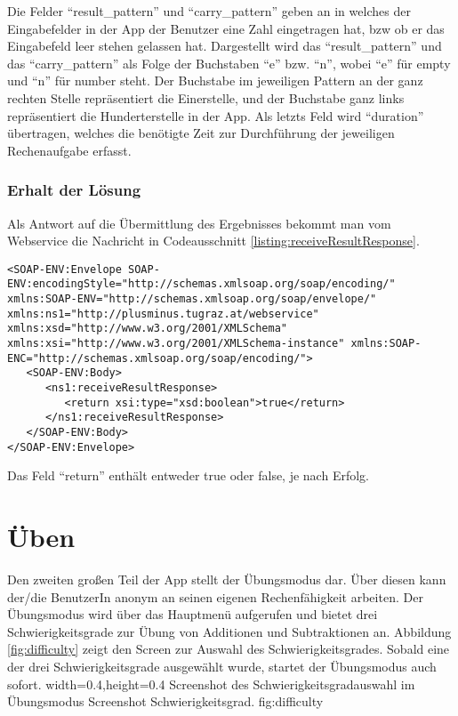 Die Felder \enquote{result\_pattern} und \enquote{carry\_pattern} geben an in welches der Eingabefelder
in der App der Benutzer eine Zahl eingetragen hat, bzw ob er das Eingabefeld leer stehen gelassen hat.
Dargestellt wird das \enquote{result\_pattern} und das \enquote{carry\_pattern} als Folge der Buchstaben
\enquote{e} bzw. \enquote{n}, wobei \enquote{e} für empty und \enquote{n} für number steht. Der Buchstabe
im jeweiligen Pattern an der ganz rechten Stelle repräsentiert die Einerstelle, und der Buchstabe ganz
links repräsentiert die Hunderterstelle in der App. Als letzts Feld wird \enquote{duration} übertragen, welches
die benötigte Zeit zur Durchführung der jeweiligen Rechenaufgabe erfasst.

\subsubsection{Erhalt der Lösung}
Als Antwort auf die Übermittlung des Ergebnisses bekommt man vom Webservice die Nachricht in Codeausschnitt
\ref{listing:receiveResultResponse}. 
\begin{lstlisting}[caption=Antwort auf Übermittlung des Ergebnisses, label=listing:receiveResultResponse]
<SOAP-ENV:Envelope SOAP-ENV:encodingStyle="http://schemas.xmlsoap.org/soap/encoding/" xmlns:SOAP-ENV="http://schemas.xmlsoap.org/soap/envelope/" xmlns:ns1="http://plusminus.tugraz.at/webservice" xmlns:xsd="http://www.w3.org/2001/XMLSchema" xmlns:xsi="http://www.w3.org/2001/XMLSchema-instance" xmlns:SOAP-ENC="http://schemas.xmlsoap.org/soap/encoding/">
   <SOAP-ENV:Body>
      <ns1:receiveResultResponse>
         <return xsi:type="xsd:boolean">true</return>
      </ns1:receiveResultResponse>
   </SOAP-ENV:Body>
</SOAP-ENV:Envelope>
\end{lstlisting}

Das Feld \enquote{return} enthält entweder true oder false, je nach Erfolg.


\section{Üben}
\label{sec:excercise}

Den zweiten großen Teil der App stellt der Übungsmodus dar. Über diesen kann der/die BenutzerIn 
anonym an seinen eigenen Rechenfähigkeit arbeiten. Der Übungsmodus wird über das Hauptmenü aufgerufen 
und bietet drei Schwierigkeitsgrade zur Übung von Additionen und Subtraktionen an. 
Abbildung \ref{fig:difficulty} zeigt den Screen zur Auswahl des Schwierigkeitsgrades. Sobald eine 
der drei Schwierigkeitsgrade ausgewählt wurde, startet der Übungsmodus auch sofort.
  {width=0.4\textwidth,height=0.4\textheight}%
  {Screenshot des Schwierigkeitsgradauswahl im Übungsmodus}%
  {Screenshot Schwierigkeitsgrad.}%
  {fig:difficulty}%

